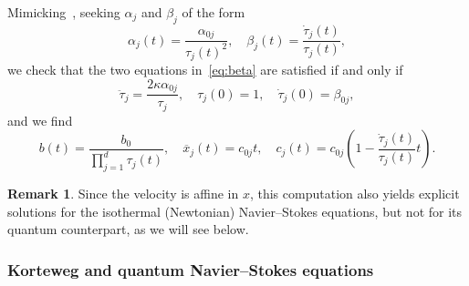\documentclass[10pt]{amsart}
\theoremstyle{definition}\newtheorem{defi}[theo]{Definition}\newtheorem{rema}[theo]{Remark}\newtheorem{exam}[theo]{Example}\newtheorem{exem}[theo]{Example}\newtheorem{nota}[theo]{Notation}
\newcommand*\<{\left\langle}
\renewcommand*\>{\right\rangle}
\begin{document}
Mimicking~\cite{LiWa06}, seeking $\alpha_j$ and $\beta_j$ of the form
\begin{equation*}
\alpha_j(t) =\frac{\alpha_{0j}}{\tau_j(t)^2},\quad \beta_j(t) =
\frac{\dot \tau_j(t)}{\tau_j(t)},
\end{equation*}
we check that the two equations in~\eqref{eq:beta} are satisfied if and only if
\begin{equation}\label{eq:tauj}
\ddot \tau_j =
\frac{2\kappa \alpha_{0j}}{\tau_j},\quad
\tau_j(0)=1,\quad \dot \tau_j(0)=\beta_{0j},
\end{equation}
and we find
\begin{equation*}
b(t)=\frac{b_0}{\prod_{j=1}^d \tau_j(t)},\quad
\overline x_j(t)= c_{0j}t,\quad c_j(t) =c_{0j}\left(1-\frac{\dot
\tau_j(t)}{\tau_j(t)}t\right).
\end{equation*}
\begin{rema}
Since the velocity is affine in $x$, this computation also yields explicit solutions for the isothermal (Newtonian) Navier--Stokes equations, but not for its quantum counterpart, as we will see below.
\end{rema}

\subsubsection{Korteweg and quantum Navier--Stokes equations}
\end{document}
